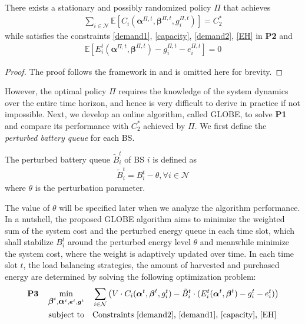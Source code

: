 \documentclass[12pt, draftclsnofoot, letterpaper, onecolumn]{IEEEtran}
\begin{document}
\begin{lemma}
There exists a stationary and possibly randomized policy $\Pi$ that achieves
\begin{align}
\sum_{i\in\mathcal{N}} \mathbb{E}\left[C_i(\bm\alpha^{\Pi,t}, \bm\beta^{\Pi,t}, g^{\Pi,t}_i)\right]=C^*_2 \label{lemmaC}
\end{align}
while satisfies the constraints \eqref{demand1}, \eqref{capacity}, \eqref{demand2}, \eqref{EH} in \textbf{P2} and
\begin{align}
\mathbb{E}\left[E_i^t(\bm\alpha^{\Pi,t}, \bm{\beta}^{\Pi,t}) - g^{\Pi,t}_i - e^{\Pi,t}_i\right]=0 \label{lemmaE}
\end{align}
\end{lemma}
\begin{proof}
The proof follows the framework in \cite{neely2010stochastic} and is omitted here for brevity.
\end{proof}
However, the optimal policy $\Pi$ requires the knowledge of the system dynamics over the entire time horizon, and hence is very difficult to derive in practice if not impossible. Next, we develop an online algorithm, called GLOBE, to solve \textbf{P1} and compare its performance with $C^*_2$ achieved by $\Pi$. We first define the \textit{perturbed battery queue} for each BS.
\begin{definition}
	The perturbed battery queue $\tilde{B}^t_i$ of BS $i$ is defined as
	\begin{align}
	\tilde{B}^t_i=B^t_i-\theta, \forall i\in\mathcal{N}
	\end{align}
	where $\theta$ is the perturbation parameter.
\end{definition}
The value of $\theta$ will be specified later when we analyze the algorithm performance. In a nutshell, the proposed GLOBE algorithm aims to minimize the weighted sum of the system cost and the perturbed energy queue in each time slot, which shall stabilize $B^t_i$ around the perturbed energy level $\theta$ and meanwhile minimize the system cost, where the weight is adaptively updated over time. In each time slot $t$, the load balancing strategies, the amount of harvested and purchased energy are determined by solving the following optimization problem:
\begin{subequations}
	\begin{align}
	\textbf{P3}~~~\min_{\mbox{\boldmath $\beta$}^t, \mbox{\boldmath $\alpha$}^t, {\boldsymbol{e}}^t, {\boldsymbol{g}}^t} &~~~ \sum_{i\in\mathcal{N}} \left(V\cdot C_i(\mbox{\boldmath $\alpha$}^t, \mbox{\boldmath $\beta$}^t, g^t_i) - \tilde{B}^t_i \cdot (E_i^t(\mbox{\boldmath $\alpha$}^t, \mbox{\boldmath $\beta$}^t) - g^t_i - e^t_i) \right)\\
	\text{subject to}&~~~\text{Constraints \eqref{demand2}, \eqref{demand1}, \eqref{capacity}, \eqref{EH}}
	\end{align}
\end{subequations}
\end{document}
